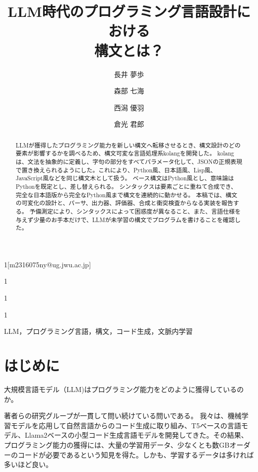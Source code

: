 \documentclass{ipsjprosym}
\begin{document}
\title{LLM時代のプログラミング言語設計における\\構文とは？}


\author{長井 夢歩}{}{1}[m2316075ny@ug.jwu.ac.jp]
\author{森部 七海}{}{1}
\author{西潟 優羽}{}{1}
\author{倉光 君郎}{}{1}

\begin{abstract}
LLMが獲得したプログラミング能力を新しい構文へ転移させるとき、構文設計のどの要素が影響するかを調べるため、構文可変な言語処理系kolangを開発した。
kolangは、文法を抽象的に定義し、字句の部分をすべてパラメータ化して、JSONの正規表現で置き換えられるようにした。これにより、Python風、日本語風、Lisp風、JavaScript風などを同じ構文木として扱う。
ベース構文はPython風とし、意味論はPythonを既定とし、差し替えられる。
シンタックスは要素ごとに重ねて合成でき、完全な日本語版から完全なPython風まで構文を連続的に動かせる。
本稿では、構文の可変化の設計と、パーサ、出力器、評価器、合成と衝突検査からなる実装を報告する。
予備測定により、シンタックスによって困惑度が異なること、また、言語仕様を与えず少量のお手本だけで、LLMが未学習の構文でプログラムを書けることを確認した。
\end{abstract}

\begin{jkeyword}
LLM，プログラミング言語，構文，コード生成，文脈内学習
\end{jkeyword}

\maketitle

\section{はじめに}

大規模言語モデル（LLM)はプログラミング能力をどのように獲得しているのか。

著者らの研究グループが一貫して問い続けている問いである。
我々は、機械学習モデルを応用して自然言語からのコード生成に取り組み\cite{Akinobu2020Corpus,Akinobu2021NMT,Akinobu2022JIP,Kajiura2022APSEC}、T5\cite{Raffel2020T5,Kajiura2023JSSST}ベースの言語モデル、Llama2\cite{Touvron2023Llama2}ベースの小型コード生成言語モデル\cite{Obara2024xSIG}を開発してきた。その結果、プログラミング能力の獲得には、大量の学習用データ、少なくとも数GBオーダーのコード\cite{Souma2025Dataset}が必要であるという知見を得た。しかも、学習するデータは多ければ多いほど良い\cite{Kaplan2020Scaling}。
\end{document}
